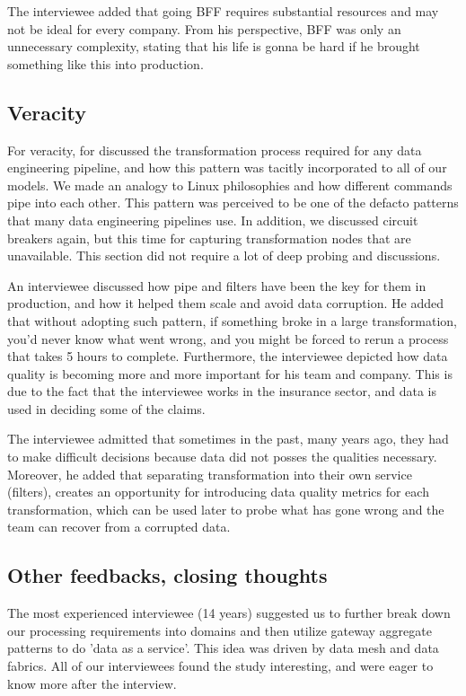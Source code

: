 \documentclass{bmcart}
\begin{document}
The interviewee added that going BFF requires substantial resources and may not be ideal for every company. From his perspective, BFF was only an unnecessary complexity, stating that his life is gonna be hard if he brought something like this into production.

\subsection{Veracity}

For veracity, for discussed the transformation process required for any data engineering pipeline, and how this pattern was tacitly incorporated to all of our models. We made an analogy to Linux philosophies and how different commands pipe into each other. This pattern was perceived to be one of the defacto patterns that many data engineering pipelines use. In addition, we discussed circuit breakers again, but this time for capturing transformation nodes that are unavailable. This section did not require a lot of deep probing and discussions. 


An interviewee discussed how pipe and filters have been the key for them in production, and how it helped them scale and avoid data corruption. He added that without adopting such pattern, if something broke in a large transformation, you'd never know what went wrong, and you might be forced to rerun a process that takes 5 hours to complete. Furthermore, the interviewee depicted how data quality is becoming more and more important for his team and company. This is due to the fact that the interviewee works in the insurance sector, and data is used in deciding some of the claims. 

The interviewee admitted that sometimes in the past, many years ago, they had to make difficult decisions because data did not posses the qualities necessary. Moreover, he added that separating transformation into their own service (filters), creates an opportunity for introducing data quality metrics for each transformation, which can be used later to probe what has gone wrong and the team can recover from a corrupted data.


\subsection{Other feedbacks, closing thoughts}


The most experienced interviewee (14 years) suggested us to further break down our processing requirements into domains and then utilize gateway aggregate patterns to do 'data as a service'. This idea was driven by data mesh and data fabrics. All of our interviewees found the study interesting, and were eager to know more after the interview. 
\end{document}
